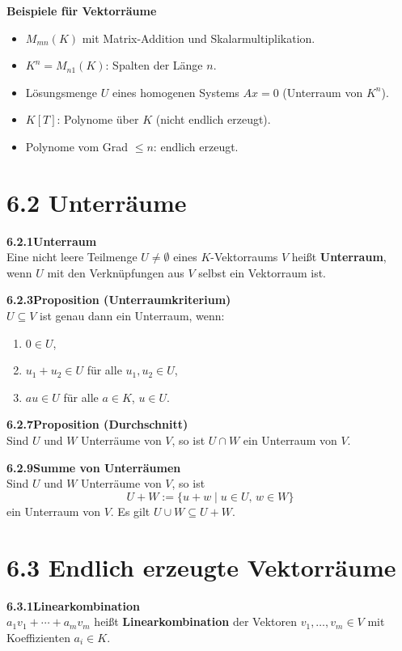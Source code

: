\documentclass[a4paper,12pt]{article}
\newcommand{\gentry}[3]{%
  \noindent\textbf{#1\quad #2}\nopagebreak\\[0.2em]
  #3\par\smallskip
}
\begin{document}
\gentry{}{Beispiele für Vektorräume}{%
  \begin{itemize}[topsep=2pt,itemsep=1pt]
    \item $M_{mn}(K)$ mit Matrix-Addition und Skalarmultiplikation.
    \item $K^n = M_{n1}(K)$: Spalten der Länge $n$.
    \item Lösungsmenge $U$ eines homogenen Systems $Ax = 0$ (Unterraum von $K^n$).
    \item $K[T]$: Polynome über $K$ (nicht endlich erzeugt).
    \item Polynome vom Grad $\le n$: endlich erzeugt.
  \end{itemize}
}

\section*{6.2 \quad Unterräume}

\gentry{6.2.1}{Unterraum}{%
  Eine nicht leere Teilmenge $U \neq \emptyset$ eines $K$-Vektorraums $V$ heißt
  \textbf{Unterraum}, wenn $U$ mit den Verknüpfungen aus $V$ selbst ein Vektorraum ist.
}

\gentry{6.2.3}{Proposition (Unterraumkriterium)}{%
  $U \subseteq V$ ist genau dann ein Unterraum, wenn:
  \begin{enumerate}[label=(\alph*),topsep=2pt,itemsep=1pt]
    \item $0 \in U$,
    \item $u_1 + u_2 \in U$ für alle $u_1, u_2 \in U$,
    \item $au \in U$ für alle $a \in K$, $u \in U$.
  \end{enumerate}
}

\gentry{6.2.7}{Proposition (Durchschnitt)}{%
  Sind $U$ und $W$ Unterräume von $V$, so ist $U \cap W$ ein Unterraum von $V$.
}

\gentry{6.2.9}{Summe von Unterräumen}{%
  Sind $U$ und $W$ Unterräume von $V$, so ist
  \[
    U + W := \{u + w \mid u \in U,\, w \in W\}
  \]
  ein Unterraum von $V$. Es gilt $U \cup W \subseteq U + W$.
}

\section*{6.3 \quad Endlich erzeugte Vektorräume}

\gentry{6.3.1}{Linearkombination}{%
  $a_1 v_1 + \cdots + a_m v_m$ heißt \textbf{Linearkombination} der Vektoren
  $v_1,\ldots,v_m \in V$ mit Koeffizienten $a_i \in K$.
}
\end{document}
